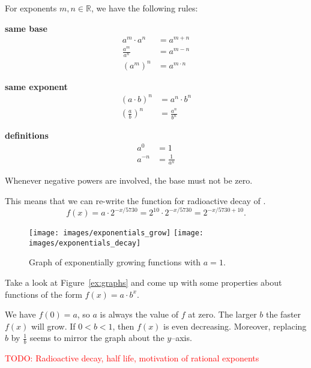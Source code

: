\begin{tcolorbox}
	For exponents $m,n\in\mathbb R$, we have the following rules:
	\begin{multicols}{3}
		\centering
		\textbf{same base}\\
		\begin{align*}
			a^m\cdot a^n&=a^{m+n} \\[10pt]
			\frac{a^m}{a^n}&=a^{m-n} \\[10pt]
			\left(a^m\right)^n&=a^{m\cdot n}
		\end{align*}
		\vfill
		\columnbreak
		
		\textbf{same exponent}\\
		\begin{align*}
			\left(a\cdot b\right)^n&=a^n\cdot b^n \\[10pt]
			\left(\frac{a}{b}\right)^n&=\frac{a^n}{b^n}
		\end{align*}
		\vfill
		\columnbreak
		
		\textbf{definitions}\\
		\begin{align*}
			a^0&=1 \\[10pt]
			a^{-n}&=\frac{1}{a^n}
		\end{align*}
		\vfill
	\end{multicols}
	Whenever negative powers are involved, the base must not be zero.
\end{tcolorbox}
This means that we can re-write the function for radioactive decay of .
\begin{equation*}
	f\left(x\right)=a\cdot 2^{-x/5730}=2^{10}\cdot 2^{-x/5730}=2^{-x/5730+10}.
\end{equation*}

\begin{figure}[ht]
	\centering
	\texttt{[image: images/exponentials\_grow]}\hfill
	\texttt{[image: images/exponentials\_decay]}
	\caption{Graph of exponentially growing functions with $a=1$.}
	\label{fig:graphs}
\end{figure}
\begin{exercise} \label{ex:graphs}
	Take a look at Figure~\ref{ex:graphs} and come up with some properties about functions of the form $f\left(x\right)=a\cdot b^x$.
\end{exercise}
\begin{solution*}
	We have $f\left(0\right)=a$, so $a$ is always the value of $f$ at zero.
	The larger $b$ the faster $f\left(x\right)$ will grow.
	If $0<b<1$, then $f\left(x\right)$ is even decreasing.
	Moreover, replacing $b$ by $\frac{1}{b}$ seems to mirror the graph about the $y$--axis.
\end{solution*}
\textcolor{red}{TODO: Radioactive decay, half life, motivation of rational exponents}